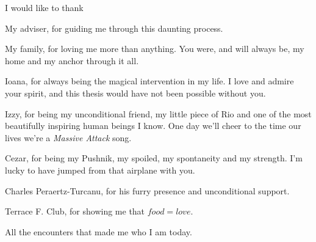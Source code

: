 I would like to thank 

My adviser, for guiding me through this daunting process. \par

My family, for loving me more than anything. You were, and will always be, my home and my anchor through it all. \par

Ioana, for always being the magical intervention in my life. I love and admire your spirit, and this thesis would have not been possible without you. \par

Izzy, for being my unconditional friend, my little piece of Rio and one of the most beautifully inspiring human beings I know. One day we'll cheer to the time our lives we're a \textit{Massive Attack} song. \par

Cezar, for being my Pushnik, my spoiled, my spontaneity and my strength. I'm lucky to have jumped from that airplane with you. \par

Charles Peraertz-Turcanu, for his furry presence and unconditional support. \par

Terrace F. Club, for showing me that $food = love$.\par

All the encounters that made me who I am today.

